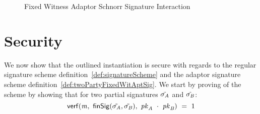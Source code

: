 \begin{figure}
    \caption{Fixed Witness Adaptor Schnorr Signature Interaction}
    \label{fig:aptSchnorrInteraction}
\end{figure}

\section{Security}\label{sec:twopartyAptSecurity}

We now show that the outlined instantiation is secure with regards to the regular signature scheme definition~\ref{def:signatureScheme} and the adaptor signature scheme definition~\ref{def:twoPartyFixedWitAptSig}.
We start by proving \cnstCorrectness of the scheme by showing that for two partial signatures $\tilde{\sigma_{\mathit{A}}}$ and $\tilde{\sigma_{\mathit{B}}}$:
\[ \mathsf{verf}(\mathit{m} ,~ \mathsf{finSig}(\tilde{\sigma_{\mathit{A}}},\tilde{\sigma_{\mathit{B}}}) ,~ \mathit{pk}_{\mathit{A}} ~\cdot~ \mathit{pk}_{\mathit{B}}) ~=~ 1 \]



